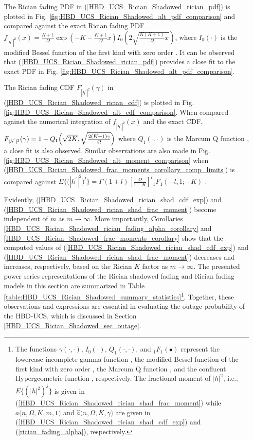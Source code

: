 The Rician fading PDF in (\ref{HBD_UCS_Rician_Shadowed_rician_pdf}) is plotted in Fig. \ref{fig:HBD_UCS_Rician_Shadowed_alt_pdf_comparison} and compared against the exact Rician fading PDF $f_{|h^{'}|^2}(x) = \frac{K+1}{\Omega} \exp\left(-K-\frac{K+1}{\Omega}x\right)I_{0}\left(2\sqrt{\frac{K(K+1)}{\Omega}x}\right)$, where $I_{0}\left(\cdot\right)$ is the modified Bessel function of the first kind with zero order \cite{gradshteyn2014table}. It can be observed that (\ref{HBD_UCS_Rician_Shadowed_rician_pdf}) provides a close fit to the exact PDF in Fig. \ref{fig:HBD_UCS_Rician_Shadowed_alt_pdf_comparison}. 

The Rician fading CDF $F_{|h^{'}|^2}(\gamma)$ in (\ref{HBD_UCS_Rician_Shadowed_rician_cdf}) is plotted in Fig. \ref{fig:HBD_UCS_Rician_Shadowed_alt_cdf_comparison}. When compared against the numerical integration of $f_{|h^{'}|^2}(x)$ and the exact CDF, $F_{|h^{'}|^2}(\gamma)=1- \\ Q_1\Big( \sqrt{2K}, \sqrt{\frac{2(K+1)\gamma}{\Omega}}\Big)$ where $Q_1\left(\cdot,\cdot\right)$ is the Marcum Q function \cite{rached2017unified}, a close fit is also observed. Similar observations are also made in Fig. \ref{fig:HBD_UCS_Rician_Shadowed_alt_moment_comparison} when (\ref{HBD_UCS_Rician_Shadowed_frac_moments_corollary_comp_limits}) is compared against $E\big\{\big(|h^{'}|^2\big)^l\big\} = \Gamma(1+l) \left[\frac{\Omega}{1+K}\right]^{l} {}_1{F_1}(-l,1;-K)$ \cite[Table II]{rached2017unified}.

Evidently, (\ref{HBD_UCS_Rician_Shadowed_rician_shad_cdf_exp}) and (\ref{HBD_UCS_Rician_Shadowed_rician_shad_frac_moment}) become independent of $m$ as $m \to \infty$. More importantly, Corollaries \ref{HBD_UCS_Rician_Shadowed_rician_fading_alpha_corollary} and \ref{HBD_UCS_Rician_Shadowed_frac_moments_corollary} show that the computed values of (\ref{HBD_UCS_Rician_Shadowed_rician_shad_cdf_exp}) and (\ref{HBD_UCS_Rician_Shadowed_rician_shad_frac_moment}) decreases and increases, respectively, based on the Rician $K$ factor as $m \to \infty$. The presented power series representations of the Rician shadowed fading and Rician fading models in this section are summarized in Table \ref{table:HBD_UCS_Rician_Shadowed_summary_statistics}\footnote{The functions $\gamma(\cdot,\cdot)$, $I_{0}\left(\cdot\right)$, $Q_1\left(\cdot,\cdot\right)$, and ${}_1{F_1}(\bullet)$ represent the lowercase incomplete gamma function \cite{chun2017comprehensive}, the modified Bessel function of the first kind with zero order \cite{gradshteyn2014table}, the Marcum Q function \cite{rached2017unified}, and the confluent Hypergeometric function \cite{gradshteyn2014table}, respectively. The fractional moment of $|h|^2$, i.e., $E\{(|h|^2)^j\}$ is given in (\ref{HBD_UCS_Rician_Shadowed_rician_shad_frac_moment}) while $\overline{a}\big(n,\Omega,K,m,1\big)$ and $\widehat{a}\big(n,\Omega,K,\gamma\big)$ are given in (\ref{HBD_UCS_Rician_Shadowed_rician_shad_cdf_exp}) and (\ref{rician_fading_alpha}), respectively.}. Together, these observations and expressions are essential in evaluating the outage probability of the HBD-UCS, which is discussed in Section \ref{HBD_UCS_Rician_Shadowed_sec_outage}.

